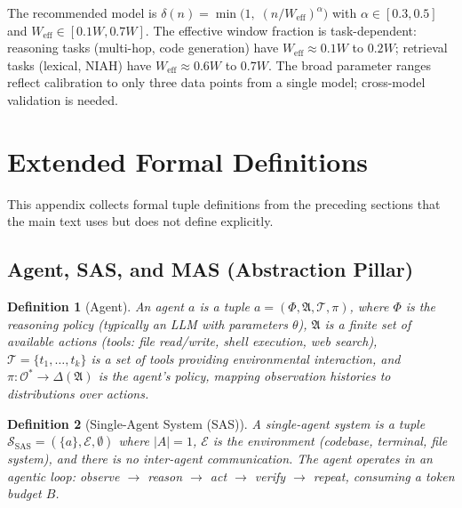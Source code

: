 \documentclass[11pt, a4paper]{googledeepmind}
\newtheorem{definition}{Definition}[section]
\begin{document}
\begin{appendices}
The recommended model is
$\delta(n) = \min\!\bigl(1,\; (n / W_{\text{eff}})^{\alpha}\bigr)$
with $\alpha \in [0.3, 0.5]$ and $W_{\text{eff}} \in [0.1W, 0.7W]$.
The effective window fraction is task-dependent: reasoning tasks
(multi-hop, code generation) have $W_{\text{eff}} \approx 0.1W$ to $0.2W$;
retrieval tasks (lexical, NIAH) have $W_{\text{eff}} \approx 0.6W$ to $0.7W$.
The broad parameter ranges reflect calibration to only three data points
from a single model; cross-model validation is needed.



\section{Extended Formal Definitions}
\label{app:formal-defs}

This appendix collects formal tuple definitions from the preceding sections
that the main text uses but does not define explicitly.

\subsection{Agent, SAS, and MAS (Abstraction Pillar)}

\begin{definition}[Agent]
\label{def:ext-agent}
An \emph{agent} $a$ is a tuple $a = (\Phi, \mathfrak{A}, \mathcal{T}, \pi)$, where
$\Phi$ is the reasoning policy (typically an LLM with parameters $\theta$),
$\mathfrak{A}$ is a finite set of available actions (tools: file read/write, shell execution, web search),
$\mathcal{T} = \{t_1, \ldots, t_k\}$ is a set of tools providing environmental interaction, and
$\pi: \mathcal{O}^* \to \Delta(\mathfrak{A})$ is the agent's policy,
mapping observation histories to distributions over actions.
\end{definition}

\begin{definition}[Single-Agent System (SAS)]
\label{def:ext-sas}
A \emph{single-agent system} is a tuple
$\mathcal{S}_{\text{SAS}} = (\{a\}, \mathcal{E}, \emptyset)$
where $|A| = 1$, $\mathcal{E}$ is the environment (codebase, terminal, file system),
and there is no inter-agent communication. The agent operates in an agentic loop:
\emph{observe $\to$ reason $\to$ act $\to$ verify $\to$ repeat},
consuming a token budget $B$.
\end{definition}


\end{appendices}
\end{document}
